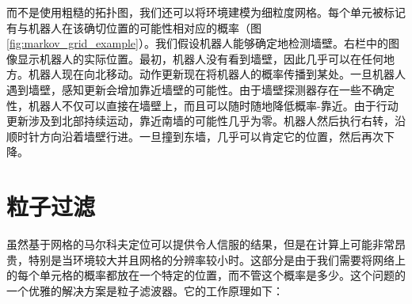 
而不是使用粗糙的拓扑图，我们还可以将环境建模为细粒度网格。每个单元被标记有与机器人在该确切位置的可能性相对应的概率（图\ref{fig:markov_grid_example}）。我们假设机器人能够确定地检测墙壁。右栏中的图像显示机器人的实际位置。最初，机器人没有看到墙壁，因此几乎可以在任何地方。机器人现在向北移动。动作更新现在将机器人的概率传播到某处。一旦机器人遇到墙壁，感知更新会增加靠近墙壁的可能性。由于墙壁探测器存在一些不确定性，机器人不仅可以直接在墙壁上，而且可以随时随地降低概率-靠近。由于行动更新涉及到北部持续运动，靠近南墙的可能性几乎为零。机器人然后执行右转，沿顺时针方向沿着墙壁行进。一旦撞到东墙，几乎可以肯定它的位置，然后再次下降。


\section{粒子过滤}
虽然基于网格的马尔科夫定位可以提供令人信服的结果，但是在计算上可能非常昂贵，特别是当环境较大并且网格的分辨率较小时。这部分是由于我们需要将网络上的每个单元格的概率都放在一个特定的位置，而不管这个概率是多少。这个问题的一个优雅的解决方案是粒子滤波器。它的工作原理如下：

